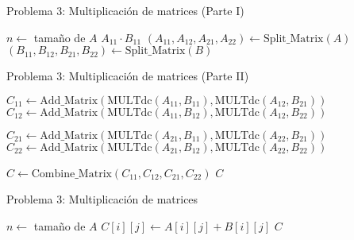 \documentclass{beamer}
\begin{document}
\begin{frame}{Problema 3: Multiplicación de matrices (Parte I)}
\scriptsize
\begin{algorithm}[H]
\caption{Multiplicación de matrices por divide y vencerás (MULTdc)}
\begin{algorithmic}[1]
    \State $n \gets$ tamaño de $A$
      \State \Return $A_{11} \cdot B_{11}$
    \EndIf
    \State $(A_{11}, A_{12}, A_{21}, A_{22}) \gets \text{Split\_Matrix}(A)$
    \State $(B_{11}, B_{12}, B_{21}, B_{22}) \gets \text{Split\_Matrix}(B)$
\end{algorithmic}
\end{algorithm}
\end{frame}

\begin{frame}{Problema 3: Multiplicación de matrices (Parte II)}
\scriptsize
\begin{algorithm}[H]
\caption{Multiplicación de matrices por divide y vencerás (cont.)}
\begin{algorithmic}[1]
    \State $C_{11} \gets \text{Add\_Matrix}(\text{MULTdc}(A_{11}, B_{11}),\text{MULTdc}(A_{12}, B_{21}))$
    \State $C_{12} \gets \text{Add\_Matrix}(\text{MULTdc}(A_{11}, B_{12}),\text{MULTdc}(A_{12}, B_{22}))$ 
  
    \State $C_{21} \gets \text{Add\_Matrix}(\text{MULTdc}(A_{21}, B_{11}), \text{MULTdc}(A_{22}, B_{21}))$
    \State $C_{22} \gets \text{Add\_Matrix}(\text{MULTdc}(A_{21}, B_{12}), \text{MULTdc}(A_{22}, B_{22}))$
    
    
    \State $C \gets \text{Combine\_Matrix}(C_{11}, C_{12}, C_{21}, C_{22})$
    \State \Return $C$
  \EndFunction

\end{algorithmic}
\end{algorithm}
\end{frame}



\begin{frame}{Problema 3: Multiplicación de matrices}
\begin{algorithm}[H]
\caption{Multiplicación de matrices por divide y vencerás}
\begin{algorithmic}[1]
  \State $n \gets$ tamaño de $A$
      \State $C[i][j] \gets A[i][j] + B[i][j]$
    \EndFor
  \EndFor
  \State \Return $C$
\EndFunction

\end{algorithmic}
\end{algorithm}
\end{frame}
\end{document}
